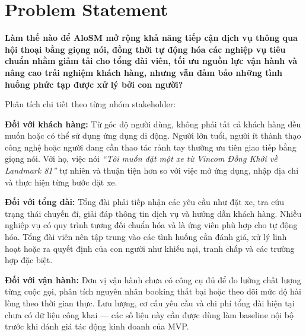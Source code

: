 \documentclass[12pt,a4paper]{article}
\begin{document}
\section{Problem Statement}

\begin{tcolorbox}[visionbox,title={Problem Statement Tổng hợp}]
  \textbf{Làm thế nào để AloSM mở rộng khả năng tiếp cận dịch vụ thông qua hội thoại bằng giọng nói, đồng thời tự động hóa các nghiệp vụ tiêu chuẩn nhằm giảm tải cho tổng đài viên, tối ưu nguồn lực vận hành và nâng cao trải nghiệm khách hàng, nhưng vẫn đảm bảo những tình huống phức tạp được xử lý bởi con người?}
\end{tcolorbox}

\vspace{0.5em}
\noindent Phân tích chi tiết theo từng nhóm stakeholder:

\begin{tcolorbox}[problembox]
  \textbf{Đối với khách hàng:} Từ góc độ người dùng, không phải tất cả khách hàng đều muốn hoặc có thể sử dụng ứng dụng di động. Người lớn tuổi, người ít thành thạo công nghệ hoặc người đang cần thao tác rảnh tay thường ưu tiên giao tiếp bằng giọng nói. Với họ, việc nói \textit{``Tôi muốn đặt một xe từ Vincom Đồng Khởi về Landmark 81''} tự nhiên và thuận tiện hơn so với việc mở ứng dụng, nhập địa chỉ và thực hiện từng bước đặt xe.
\end{tcolorbox}

\begin{tcolorbox}[problembox,title={Problem Statement --- Tổng đài viên}]
  \textbf{Đối với tổng đài:} Tổng đài phải tiếp nhận các yêu cầu như đặt xe, tra cứu trạng thái chuyến đi, giải đáp thông tin dịch vụ và hướng dẫn khách hàng. Nhiều nghiệp vụ có quy trình tương đối chuẩn hóa và là ứng viên phù hợp cho tự động hóa. Tổng đài viên nên tập trung vào các tình huống cần đánh giá, xử lý linh hoạt hoặc ra quyết định của con người như khiếu nại, tranh chấp và các trường hợp đặc biệt.
\end{tcolorbox}

\begin{tcolorbox}[problembox,title={Problem Statement --- Đơn vị vận hành}]
  \textbf{Đối với vận hành:} Đơn vị vận hành chưa có công cụ đủ để đo lường chất lượng từng cuộc gọi, phân tích nguyên nhân booking thất bại hoặc theo dõi mức độ hài lòng theo thời gian thực. Lưu lượng, cơ cấu yêu cầu và chi phí tổng đài hiện tại chưa có dữ liệu công khai --- các số liệu này cần được dùng làm baseline nội bộ trước khi đánh giá tác động kinh doanh của MVP.
\end{tcolorbox}
\end{document}
